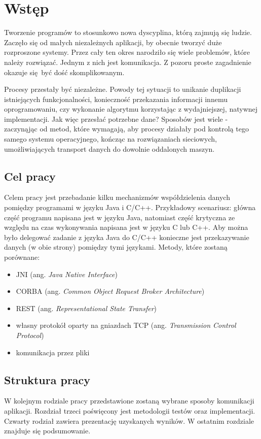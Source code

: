 \chapter{Wstęp}

Tworzenie programów to stosunkowo nowa dyscyplina, którą zajmują się ludzie. Zaczęło się od małych niezależnych aplikacji, by obecnie tworzyć duże rozproszone systemy. Przez cały ten okres narodziło się wiele problemów, które należy rozwiązać. Jednym z nich jest komunikacja. Z pozoru proste zagadnienie okazuje się być dość skomplikowanym.

Procesy przestały być niezależne. Powody tej sytuacji to unikanie duplikacji istniejących funkcjonalności, konieczność przekazania informacji innemu oprogramowaniu, czy wykonanie algorytmu korzystając z wydajniejszej, natywnej implementacji. Jak więc przesłać potrzebne dane? Sposobów jest wiele - zaczynąjąc od metod, które wymagają, aby procesy działały pod kontrolą tego samego systemu operacyjnego, kończąc na rozwiązaniach sieciowych, umożliwiających transport danych do dowolnie oddalonych maszyn.


\section{Cel pracy}

Celem pracy jest przebadanie kilku mechanizmów współdzielenia  danych pomiędzy programami w języku Java i C/C++. 
Przykładowy scenariusz: główna część programu napisana jest w języku Java, natomiast część krytyczna ze względu na czas wykonywania napisana jest w języku C lub C++. Aby można było delegować zadanie z języka Java do C/C++ konieczne jest przekazywanie danych (w obie strony) pomiędzy tymi językami. Metody, które zostaną porównane:
\begin{itemize}
    \item JNI (ang. \textit{Java Native Interface})
    \item CORBA (ang. \textit{Common Object Request Broker Architecture})
    \item REST (ang. \textit{Representational State Transfer})
    \item własny protokół oparty na gniazdach TCP (ang. \textit{Transmission Control Protocol})
    \item komunikacja przez pliki
\end{itemize}


\section{Struktura pracy}

W kolejnym rodziale pracy przedstawione zostaną wybrane sposoby komunikacji aplikacji.
Rozdział trzeci poświęcony jest metodologii testów oraz implementacji.
Czwarty rodział zawiera prezentację uzyskanych wyników.
W ostatnim rozdziale znajduje się podsumowanie.
